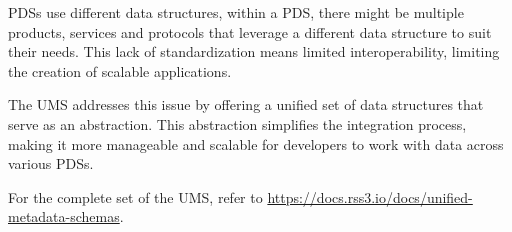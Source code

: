 \glspl{PDS} use different data structures, within a \gls{PDS}, there might be multiple products, services and protocols that leverage a different data structure to suit their needs.
This lack of standardization means limited interoperability, limiting the creation of scalable applications.

The \gls{UMS} addresses this issue by offering a unified set of data structures that serve as an abstraction.
This abstraction simplifies the integration process, making it more manageable and scalable for developers to work with data across various \glspl{PDS}.

For the complete set of the \gls{UMS}, refer to \url{https://docs.rss3.io/docs/unified-metadata-schemas}.

